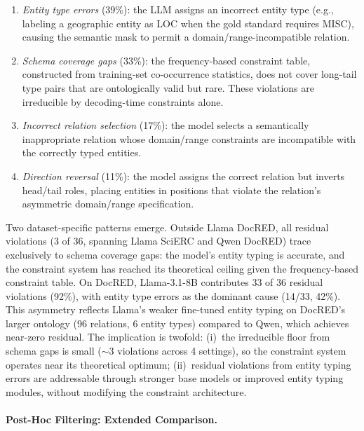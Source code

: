 \begin{enumerate}[nosep,leftmargin=*]
\item \emph{Entity type errors} (39\%): the LLM assigns an incorrect entity type (e.g., labeling a geographic entity as \textsc{LOC} when the gold standard requires \textsc{MISC}), causing the semantic mask to permit a domain/range-incompatible relation.
\item \emph{Schema coverage gaps} (33\%): the frequency-based constraint table, constructed from training-set co-occurrence statistics, does not cover long-tail type pairs that are ontologically valid but rare. These violations are irreducible by decoding-time constraints alone.
\item \emph{Incorrect relation selection} (17\%): the model selects a semantically inappropriate relation whose domain/range constraints are incompatible with the correctly typed entities.
\item \emph{Direction reversal} (11\%): the model assigns the correct relation but inverts head/tail roles, placing entities in positions that violate the relation's asymmetric domain/range specification.
\end{enumerate}

Two dataset-specific patterns emerge.
Outside Llama DocRED, all residual violations (3 of 36, spanning Llama SciERC and Qwen DocRED) trace exclusively to schema coverage gaps: the model's entity typing is accurate, and the constraint system has reached its theoretical ceiling given the frequency-based constraint table.
On DocRED, Llama-3.1-8B contributes 33 of 36 residual violations (92\%), with entity type errors as the dominant cause (14/33, 42\%).
This asymmetry reflects Llama's weaker fine-tuned entity typing on DocRED's larger ontology (96 relations, 6 entity types) compared to Qwen, which achieves near-zero residual.
The implication is twofold: (i)~the irreducible floor from schema gaps is small ($\sim$3 violations across 4 settings), so the constraint system operates near its theoretical optimum; (ii)~residual violations from entity typing errors are addressable through stronger base models or improved entity typing modules, without modifying the constraint architecture.


\paragraph{Post-Hoc Filtering: Extended Comparison.}
\label{app:posthoc-extended}

